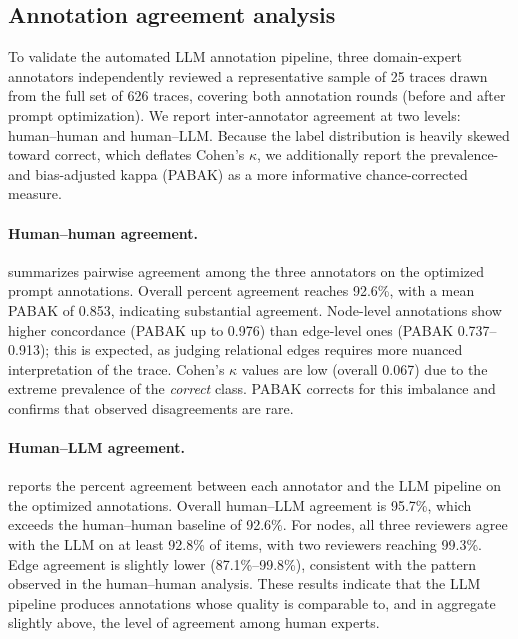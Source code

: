\subsection{Annotation agreement analysis} \label{app:annotation-agreement}

To validate the automated LLM annotation pipeline, three domain-expert annotators independently reviewed a representative sample of 25 traces drawn from the full set of 626 traces, covering both annotation rounds (before and after prompt optimization). We report inter-annotator agreement at two levels: human--human and human--LLM. Because the label distribution is heavily skewed toward correct, which deflates Cohen's $\kappa$, we additionally report the prevalence- and bias-adjusted kappa (PABAK) as a more informative chance-corrected measure.

\paragraph{Human–human agreement.}
 summarizes pairwise agreement among the three annotators on the optimized prompt annotations. Overall percent agreement reaches 92.6\%, with a mean PABAK of 0.853, indicating substantial agreement. Node-level annotations show higher concordance (PABAK up to 0.976) than edge-level ones (PABAK 0.737--0.913); this is expected, as judging relational edges requires more nuanced interpretation of the trace. Cohen's $\kappa$ values are low (overall 0.067) due to the extreme prevalence of the \emph{correct} class. PABAK corrects for this imbalance and confirms that observed disagreements are rare.

\begin{table}[H]
\centering
\caption{\textbf{Human–human inter-annotator agreement on optimized annotations.} Pairwise Cohen's $\kappa$, PABAK, and percent agreement for nodes and edges across three domain experts. Low $\kappa$ values reflect the high prevalence of the \emph{correct} class; PABAK corrects for this imbalance.}
\label{tab:agreement-hh-new}

\end{table}

\paragraph{Human–LLM agreement.}
 reports the percent agreement between each annotator and the LLM pipeline on the optimized annotations. Overall human--LLM agreement is 95.7\%, which exceeds the human--human baseline of 92.6\%. For nodes, all three reviewers agree with the LLM on at least 92.8\% of items, with two reviewers reaching 99.3\%. Edge agreement is slightly lower (87.1\%--99.8\%), consistent with the pattern observed in the human--human analysis. These results indicate that the LLM pipeline produces annotations whose quality is comparable to, and in aggregate slightly above, the level of agreement among human experts.

